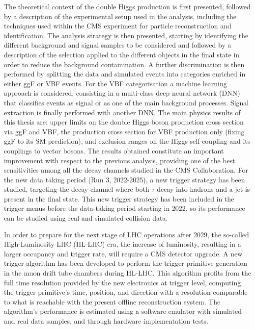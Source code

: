 \documentclass[../main.tex]{subfiles}
\begin{document}
The theoretical context of the double Higgs production is first presented, followed by a description of the experimental setup used in the analysis, including the techniques used within the CMS experiment for particle reconstruction and identification. The analysis strategy is then presented, starting by identifying the different background and signal samples to be considered and followed by a description of the selection applied to the different objects in the final state in order to reduce the background contamination. A further discrimination is then performed by splitting the data and simulated events into categories enriched in either ggF or VBF events. For the VBF categorisation a machine learning approach is considered, consisting in a multi-class deep neural network (DNN) that classifies events as signal or as one of the main background processes. Signal extraction is finally performed with another DNN. The main physics results of this thesis are: upper limits on the double Higgs boson production cross section via ggF and VBF, the production cross section for VBF production only (fixing ggF to its SM prediction), and exclusion ranges on the Higgs self-coupling and its couplings to vector bosons. The results obtained constitute an important improvement with respect to the previous \hhbbtt{} analysis, providing one of the best sensitivities among all the decay channels studied in the CMS Collaboration. For the new data taking period (Run 3, 2022-2025), a new trigger strategy has been studied, targeting the decay channel where both $\tau$ decay into hadrons and a jet is present in the final state. This new trigger strategy has been included in the trigger menus before the data-taking period starting in 2022, so its performance can be studied using real and simulated collision data. 

In order to prepare for the next stage of LHC operations after 2029, the so-called High-Luminosity LHC (HL-LHC) era, the increase of luminosity, resulting in a larger occupancy and trigger rate, will require a CMS detector upgrade. A new trigger algorithm has been developed to perform the trigger primitive generation in the muon drift tube chambers during HL-LHC. This algorithm profits from the full time resolution provided by the new electronics at trigger level, computing the trigger primitive's time, position, and direction with a resolution comparable to what is reachable with the present offline reconstruction system. The algorithm's performance is estimated using a software emulator with simulated and real data samples, and through hardware implementation tests.

\newpage
\end{document}
